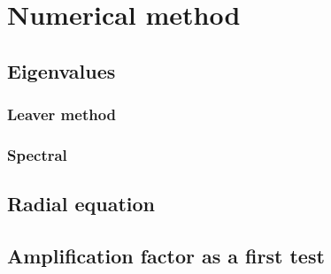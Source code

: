 
\chapter{Numerical method} %
\label{Chapter4}


\section{Eigenvalues}

\subsection{Leaver method}
\subsection{Spectral}

\section{Radial equation}

\section{Amplification factor as a first test}


\cleardoublepage